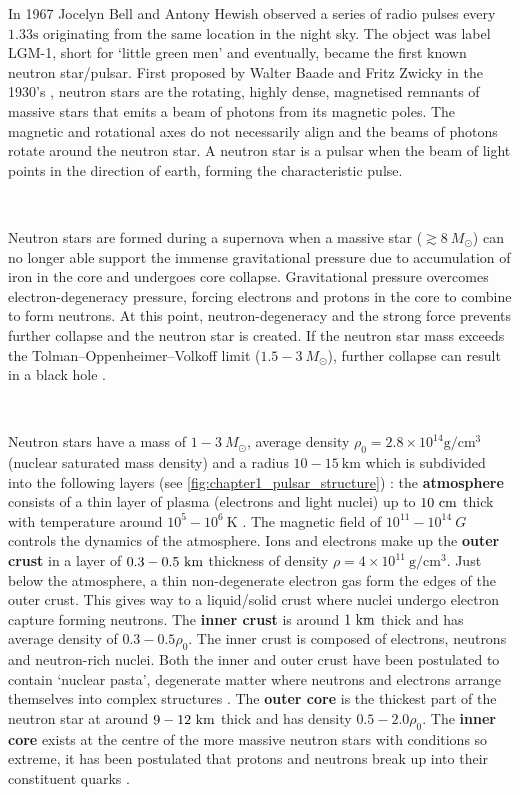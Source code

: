 In 1967 Jocelyn Bell and Antony Hewish observed a series of radio pulses every $1.33\si{\second}$ originating from the same location in the night sky. The object was label LGM-1, short for `little green men' and eventually, became the first known neutron star/pulsar. First proposed by Walter Baade and Fritz Zwicky in the 1930's \citep{1934PhRv...46...76B}, neutron stars are the rotating, highly dense, magnetised remnants of massive stars that emits a beam of photons from its magnetic poles. The magnetic and rotational axes do not necessarily align and the beams of photons rotate around the neutron star. A neutron star is a pulsar when the beam of light points in the direction of earth, forming the characteristic pulse.
\par~\par
Neutron stars are formed during a supernova when a massive star ($\gtrsim 8~M_\odot$) can no longer able support the immense gravitational pressure due to accumulation of iron in the core and undergoes core collapse. Gravitational pressure overcomes electron-degeneracy pressure, forcing electrons and protons in the core to combine to form neutrons. At this point, neutron-degeneracy and the strong force prevents further collapse and the neutron star is created. If the neutron star mass exceeds the Tolman–Oppenheimer–Volkoff limit ($1.5-3~M_\odot$), further collapse can result in a black hole \citep{1996A&A...305..871B, 2015SSRv..188..187S}.
\par~\par
Neutron stars have a mass of $1-3~M_\odot$, average density $\rho_0=2.8\times 10^{14}\si{\gram\per\centi\meter\cubed}$ (nuclear saturated mass density) and a radius $10-15~\si{\kilo\meter}$ which is subdivided into the following layers (see \autoref{fig:chapter1_pulsar_structure}) \citep{2007ASSL..326.....H}: the \textbf{atmosphere} consists of a thin layer of plasma (electrons and light nuclei) up to $10~\si{\centi\meter}$ thick with temperature around $10^5-10^6~\si{\kelvin}$ \citep{2002nsps.conf..263Z}. The magnetic field of $10^{11}-10^{14}~\si{G}$ controls the dynamics of the atmosphere. Ions and electrons make up the \textbf{outer crust} in a layer of $0.3-0.5~\si{\kilo\meter}$ thickness of density $\rho=4\times 10^{11}~\si{\gram\per\centi\meter\cubed}$. Just below the atmosphere, a thin non-degenerate electron gas form the edges of the outer crust. This gives way to a liquid/solid crust where nuclei undergo electron capture forming neutrons. The \textbf{inner crust} is around $1~\si{\kilo\meter}$ thick and has average density of $0.3-0.5\rho_0$. The inner crust is composed of electrons, neutrons and neutron-rich nuclei. Both the inner and outer crust have been postulated to contain `nuclear pasta', degenerate matter where neutrons and electrons arrange themselves into complex structures \citep{PhysRevC.88.065807}. The \textbf{outer core} is the thickest part of the neutron star at around $9-12~\si{\kilo\meter}$ thick and has density $0.5-2.0\rho_0$. The \textbf{inner core} exists at the centre of the more massive neutron stars with conditions so extreme, it has been postulated that protons and neutrons break up into their constituent quarks \citep{2007ASSL..326.....H}.
